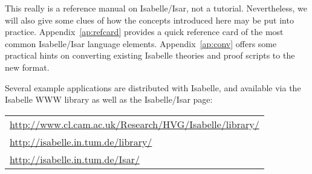 \medskip This really is a reference manual on Isabelle/Isar, not a tutorial.
Nevertheless, we will also give some clues of how the concepts introduced here
may be put into practice.  Appendix~\ref{ap:refcard} provides a quick
reference card of the most common Isabelle/Isar language elements.
Appendix~\ref{ap:conv} offers some practical hints on converting existing
Isabelle theories and proof scripts to the new format.

Several example applications are distributed with Isabelle, and available via
the Isabelle WWW library as well as the Isabelle/Isar page:
\begin{center}\small
  \begin{tabular}{l}
    \url{http://www.cl.cam.ac.uk/Research/HVG/Isabelle/library/} \\
    \url{http://isabelle.in.tum.de/library/} \\[1ex]
    \url{http://isabelle.in.tum.de/Isar/} \\
  \end{tabular}
\end{center}

